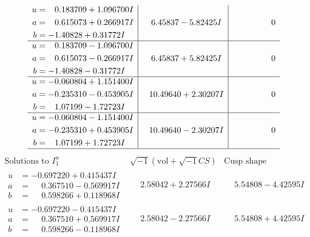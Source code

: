 \documentclass[1p]{elsarticle_modified}
\theoremstyle{definition}
\newcommand{\I}{\sqrt{-1}}
\begin{document}
$$\begin{array}{c|c|c}
\begin{aligned}
u &= \phantom{-}0.183709 + 1.096700 I \\
a &= \phantom{-}0.615073 + 0.266917 I \\
b &= -1.40828 + 0.31772 I\end{aligned}
 & \phantom{-}6.45837 - 5.82425 I & \phantom{-0.000000 } 0 \\ \hline\begin{aligned}
u &= \phantom{-}0.183709 - 1.096700 I \\
a &= \phantom{-}0.615073 - 0.266917 I \\
b &= -1.40828 - 0.31772 I\end{aligned}
 & \phantom{-}6.45837 + 5.82425 I & \phantom{-0.000000 } 0 \\ \hline\begin{aligned}
u &= -0.060804 + 1.151400 I \\
a &= -0.235310 - 0.453905 I \\
b &= \phantom{-}1.07199 - 1.72723 I\end{aligned}
 & \phantom{-}10.49640 + 2.30207 I & \phantom{-0.000000 } 0 \\ \hline\begin{aligned}
u &= -0.060804 - 1.151400 I \\
a &= -0.235310 + 0.453905 I \\
b &= \phantom{-}1.07199 + 1.72723 I\end{aligned}
 & \phantom{-}10.49640 - 2.30207 I & \phantom{-0.000000 } 0\\
 \hline 
 \end{array}$$\newpage$$\begin{array}{c|c|c}  
\text{Solutions to }I^u_{1}& \I (\text{vol} + \sqrt{-1}CS) & \text{Cusp shape}\\
 \hline 
\begin{aligned}
u &= -0.697220 + 0.415437 I \\
a &= \phantom{-}0.367510 - 0.569917 I \\
b &= \phantom{-}0.598266 + 0.118968 I\end{aligned}
 & \phantom{-}2.58042 + 2.27566 I & \phantom{-}5.54808 - 4.42595 I \\ \hline\begin{aligned}
u &= -0.697220 - 0.415437 I \\
a &= \phantom{-}0.367510 + 0.569917 I \\
b &= \phantom{-}0.598266 - 0.118968 I\end{aligned}
 & \phantom{-}2.58042 - 2.27566 I & \phantom{-}5.54808 + 4.42595 I \\ \hline\begin{aligned}

\end{aligned}
\end{array}$$
\end{document}
